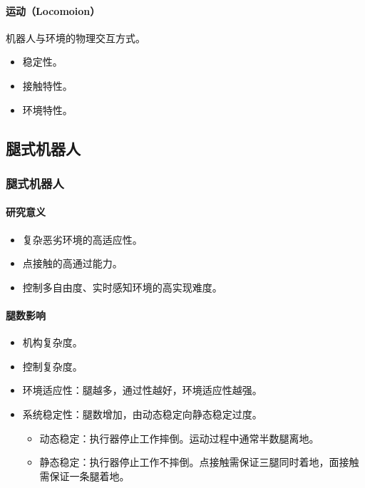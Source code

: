 \documentclass[
12pt, %
a4paper, 
oneside, %
headinclude,footinclude, %
]{scrartcl}
\begin{document}
\paragraph{运动（Locomoion）}
机器人与环境的物理交互方式。
\begin{itemize}
\item 稳定性。
\item 接触特性。
\item 环境特性。
\end{itemize}
\subsection[腿式机器人]{腿式机器人}
\subsubsection[腿式机器人]{腿式机器人}
\paragraph{研究意义}
\begin{itemize}
\item 复杂恶劣环境的高适应性。
\item 点接触的高通过能力。
\item 控制多自由度、实时感知环境的高实现难度。
\end{itemize}
\paragraph{腿数影响}
\begin{itemize}
\item 机构复杂度。
\item 控制复杂度。
\item 环境适应性：腿越多，通过性越好，环境适应性越强。
\item 系统稳定性：腿数增加，由动态稳定向静态稳定过度。
\begin{itemize}
\item 动态稳定：执行器停止工作摔倒。运动过程中通常半数腿离地。
\item 静态稳定：执行器停止工作不摔倒。点接触需保证三腿同时着地，面接触需保证一条腿着地。
\end{itemize}
\end{itemize}
\end{document}
